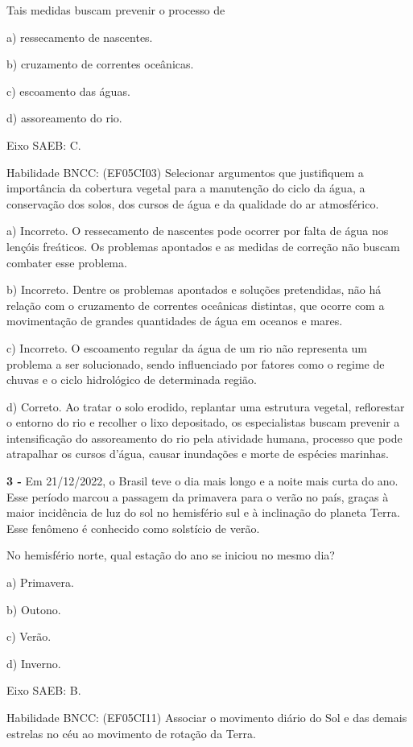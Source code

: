 Tais medidas buscam prevenir o processo de

a) ressecamento de nascentes.

b) cruzamento de correntes oceânicas.

c) escoamento das águas.

d) assoreamento do rio.

Eixo SAEB: C.

Habilidade BNCC: (EF05CI03) Selecionar argumentos que justifiquem a
importância da cobertura vegetal para a manutenção do ciclo da água, a
conservação dos solos, dos cursos de água e da qualidade do ar
atmosférico.

a) Incorreto. O ressecamento de nascentes pode ocorrer por falta de água
nos lençóis freáticos. Os problemas apontados e as medidas de correção
não buscam combater esse problema.

b) Incorreto. Dentre os problemas apontados e soluções pretendidas, não
há relação com o cruzamento de correntes oceânicas distintas, que ocorre
com a movimentação de grandes quantidades de água em oceanos e mares.

c) Incorreto. O escoamento regular da água de um rio não representa um
problema a ser solucionado, sendo influenciado por fatores como o regime
de chuvas e o ciclo hidrológico de determinada região.

d) Correto. Ao tratar o solo erodido, replantar uma estrutura vegetal,
reflorestar o entorno do rio e recolher o lixo depositado, os
especialistas buscam prevenir a intensificação do assoreamento do rio
pela atividade humana, processo que pode atrapalhar os cursos d'água,
causar inundações e morte de espécies marinhas.

\textbf{3 -} Em 21/12/2022, o Brasil teve o dia mais longo e a noite
mais curta do ano. Esse período marcou a passagem da primavera para o
verão no país, graças à maior incidência de luz do sol no hemisfério sul
e à inclinação do planeta Terra. Esse fenômeno é conhecido como
solstício de verão.

No hemisfério norte, qual estação do ano se iniciou no mesmo dia?

a) Primavera.

b) Outono.

c) Verão.

d) Inverno.

Eixo SAEB: B.

Habilidade BNCC: (EF05CI11) Associar o movimento diário do Sol e das
demais estrelas no céu ao movimento de rotação da Terra.

